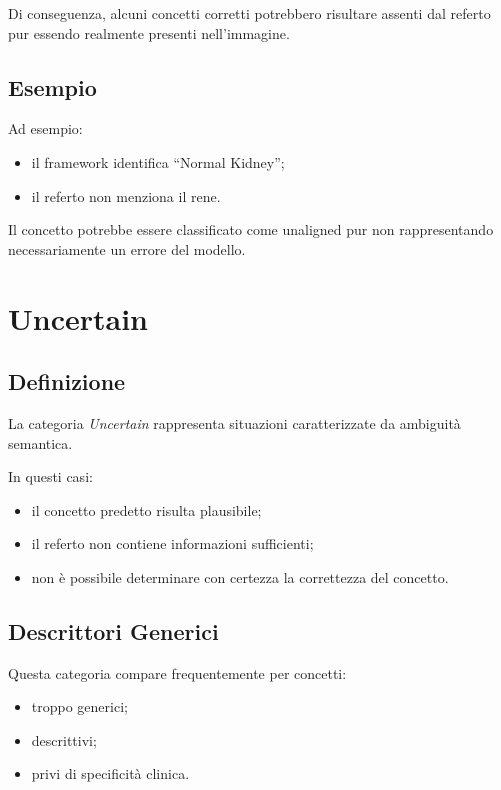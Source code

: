 Di conseguenza, alcuni concetti corretti potrebbero risultare assenti dal referto pur essendo realmente presenti nell'immagine.

\subsection{Esempio}

Ad esempio:

\begin{itemize}
    \item il framework identifica ``Normal Kidney'';
    \item il referto non menziona il rene.
\end{itemize}

Il concetto potrebbe essere classificato come unaligned pur non rappresentando necessariamente un errore del modello.

\section{Uncertain}

\subsection{Definizione}

La categoria \textit{Uncertain} rappresenta situazioni caratterizzate da ambiguità semantica.

In questi casi:

\begin{itemize}
    \item il concetto predetto risulta plausibile;
    \item il referto non contiene informazioni sufficienti;
    \item non è possibile determinare con certezza la correttezza del concetto.
\end{itemize}

\subsection{Descrittori Generici}

Questa categoria compare frequentemente per concetti:

\begin{itemize}
    \item troppo generici;
    \item descrittivi;
    \item privi di specificità clinica.
\end{itemize}

